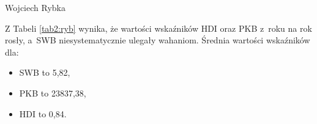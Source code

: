\begin{artplenv}{Wojciech Rybka}
%
%


Z Tabeli \ref{tab2:ryb} wynika, że wartości wskaźników HDI oraz PKB z~roku na rok rosły, a~SWB niesystematycznie ulegały wahaniom.
Średnia wartości wskaźników dla:

\begin{itemize}
\item SWB to 5,82, 
\item PKB to 23837,38, 
\item HDI to 0,84.
\end{itemize}



\end{artplenv}
